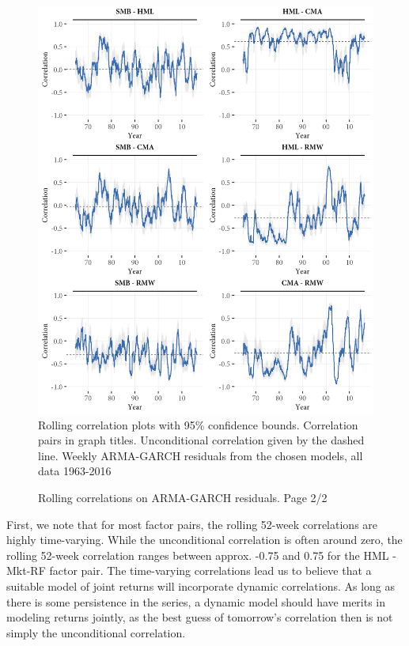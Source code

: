 \begin{figure}[H]
  \caption{Rolling correlations on ARMA-GARCH residuals. Page 2/2}
  \label{fig:rolling2}
  \centering
  \begin{minipage}{\textwidth}
  \includegraphics[scale=1]{graphics/rolling2.png}  
  \vspace{3mm}
  \footnotesize
  Rolling correlation plots with 95\% confidence bounds. Correlation pairs in graph titles. Unconditional correlation given by the dashed line. Weekly ARMA-GARCH residuals from the chosen models, all data 1963-2016
  \end{minipage}
\end{figure}
First, we note that for most factor pairs, the rolling 52-week correlations are highly time-varying. While the unconditional correlation is often around zero, the rolling 52-week correlation ranges between approx. -0.75 and 0.75 for the HML - Mkt-RF factor pair. The time-varying correlations lead us to believe that a suitable model of joint returns will incorporate dynamic correlations. As long as there is some persistence in the series, a dynamic model should have merits in modeling returns jointly, as the best guess of tomorrow's correlation then is not simply the unconditional correlation.

